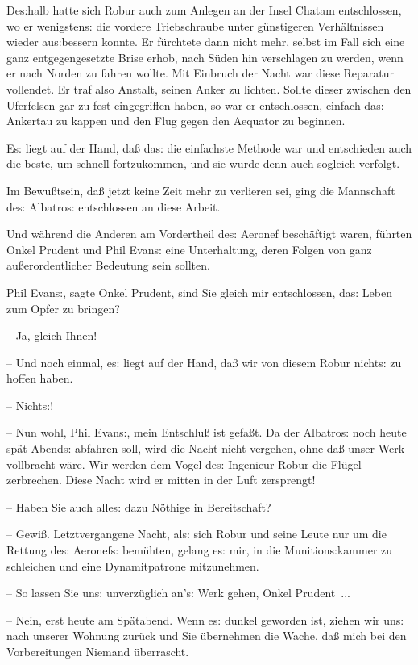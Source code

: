 \documentclass[oneside,12pt]{book}
\newcommand{\s}{s:}
\begin{document}
De{\s}halb hatte sich Robur auch zum Anlegen an der Insel Chatam
entschlossen, wo er wenigsten{\s} die vordere Triebschraube unter
g\"unstigeren Verh\"altnissen wieder au{\s}bessern konnte. Er
f\"urchtete dann nicht mehr, selbst im Fall sich eine ganz
entgegengesetzte Brise erhob, nach S\"uden hin verschlagen zu werden,
wenn er nach Norden zu fahren wollte. Mit Einbruch der Nacht war
diese Reparatur vollendet. Er traf also Anstalt, seinen Anker zu
lichten. Sollte dieser zwischen den Uferfelsen gar zu fest
eingegriffen haben, so war er entschlossen, einfach da{\s} Ankertau
zu kappen und den Flug gegen den Aequator zu beginnen.

E{\s} liegt auf der Hand, da{\ss} da{\s} die einfachste Methode war
und entschieden auch die beste, um schnell fort\/zukommen, und sie
wurde denn auch sogleich verfolgt.

Im Bewu{\ss}tsein, da{\ss} jetzt keine Zeit mehr zu verlieren sei,
ging die Mannschaft de{\s} {\glqq}Albatro{\s}{\grqq} entschlossen an
diese Arbeit.

Und w\"ahrend die Anderen am Vordertheil de{\s} Aeronef besch\"aftigt
waren, f\"uhrten Onkel Prudent und Phil Evan{\s} eine Unterhaltung,
deren Folgen von ganz au{\ss}erordentlicher Bedeutung sein sollten.

{\glqq}Phil Evan{\s}, sagte Onkel Prudent, sind Sie gleich mir
entschlossen, da{\s} Leben zum Opfer zu bringen?

-- Ja, gleich Ihnen!

-- Und noch einmal, e{\s} liegt auf der Hand, da{\ss} wir von diesem
Robur nicht{\s} zu hoffen haben.

-- Nicht{\s}!

-- Nun wohl, Phil Evan{\s}, mein Entschlu{\ss} ist gefa{\ss}t. Da der
{\glqq}Albatro{\s}{\grqq} noch heute sp\"at Abend{\s} abfahren soll,
wird die Nacht nicht vergehen, ohne da{\ss} unser Werk vollbracht
w\"are. Wir werden dem Vogel de{\s} Ingenieur Robur die Fl\"ugel
zerbrechen. Diese Nacht wird er mitten in der Luft zersprengt!

-- Haben Sie auch alle{\s} dazu N\"othige in Bereitschaft?

-- Gewi{\ss}. Letztvergangene Nacht, al{\s} sich Robur und seine
Leute nur um die Rettung de{\s} Aeronef{\s} bem\"uhten, gelang e{\s}
mir, in die Munition{\s}kammer zu schleichen und eine Dynamitpatrone
mit\/zunehmen.

-- So lassen Sie un{\s} unverz\"uglich an'{\s} Werk gehen, Onkel
Prudent~...

-- Nein, erst heute am Sp\"atabend. Wenn e{\s} dunkel geworden ist,
ziehen wir un{\s} nach unserer Wohnung zur\"uck und Sie \"ubernehmen
die Wache, da{\ss} mich bei den Vorbereitungen Niemand
\"uberrascht.{\grqq}
\end{document}
